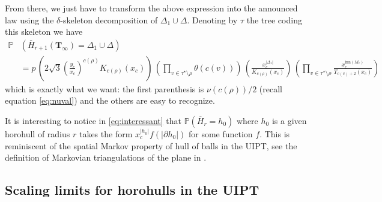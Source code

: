 \documentclass[10pt]{amsart}
\theoremstyle{definition}\newtheorem{defi}[theo]{Definition}\newtheorem{rema}[theo]{Remark}\newtheorem{exam}[theo]{Example}\newtheorem{exem}[theo]{Example}\newtheorem{nota}[theo]{Notation}
\begin{document}
From there, we just have to transform the above expression into the announced law using the $\delta$-skeleton decomposition of $\Delta_1 \cup \Delta$. Denoting by $\tau$ the tree coding this skeleton we have
\begin{align*}
\mathbb P &\left( \overline{H}_{r+1} (\mathbf T_\infty) = \Delta_1 \cup \Delta \right)\\
&  =
p \, \left(2\sqrt{3} \left(\frac{y_c}{x_c}\right)^{c(\rho)} K_{c(\rho)} (x_c)\right) \, \left(\prod_{v \in \tau^\star\setminus \rho} \theta(c(v))\right) \,
\left( \frac{x_c^{|\Delta_1|}}{K_{c(\rho)} (x_c)} \right)
\,
\left(\prod_{v \in \tau^\star\setminus \rho} \frac{x_c^{ \mathrm{inn}(M_v)}}{T_{c(v)+2}(x_c)} \right)
\end{align*}
which is exactly what we want: the first parenthesis is $\nu(c(\rho))/2$ (recall equation \eqref{eq:nuval}) and the others are easy to recognize.
\endproof
\begin{remark} It is interesting to notice in \eqref{eq:interessant} that $ \mathbb{P}( \overline{H}_{r} = h_{0})$ where $h_{0}$ is a given horohull of radius $r$ takes the form $x_{c}^{|h_{0}|} f(|\partial h_{0}|)$ for some function $f$. This is reminiscent of the spatial Markov property of hull of balls in the UIPT, see the definition of Markovian triangulations of the plane in \cite[Eq (1)]{CurPSHIT}.\end{remark}


\subsection{Scaling limits for horohulls in the UIPT}
\label{sec:scaling}
\end{document}
